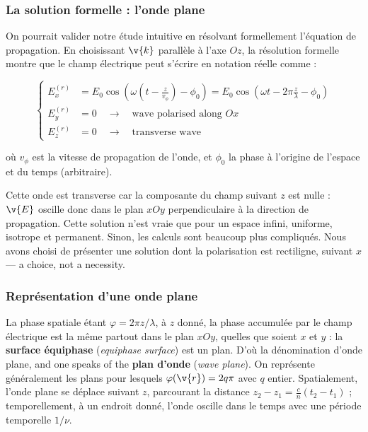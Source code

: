 \subsubsection{La solution formelle : l'onde plane}

On pourrait valider notre étude intuitive en résolvant formellement l'équation
de propagation. En choisissant $\v{k}$ parallèle à l'axe $Oz$, la résolution
formelle montre que le champ électrique peut s'écrire en notation réelle comme :

\[
  \left\{
  \begin{aligned}
    E^{(r)}_x&=E_0\cos\!\left(\omega\left(t-\frac{z}{v_\phi}\right)-\phi_0\right)
             =E_0\cos\!\left(\omega t-2\pi\frac{z}{\lambda}-\phi_0\right)\\
    E^{(r)}_y&=0 \quad\to\quad \text{wave polarised along } Ox\\
    E^{(r)}_z&=0 \quad\to\quad \text{transverse wave}
  \end{aligned}
  \right.
\]

où $v_\phi$ est la vitesse de propagation de l'onde, et $\phi_0$ la phase à
l'origine de l'espace et du temps (arbitraire).

\begin{remark}
  Cette onde est transverse car la composante du champ suivant $z$ est nulle :
  $\v{E}$ oscille donc dans le plan $xOy$ perpendiculaire à la direction de
  propagation. Cette solution n'est vraie que pour un espace infini, uniforme,
  isotrope et permanent. Sinon, les calculs sont beaucoup plus compliqués. Nous
  avons choisi de présenter une solution dont la polarisation est rectiligne,
  suivant $x$ --- a choice, not a necessity.
\end{remark}

\subsubsection{Représentation d'une onde plane}

La phase spatiale étant $\varphi=2\pi z/\lambda$, à $z$ donné, la phase
accumulée par le champ électrique est la même partout dans le plan $xOy$,
quelles que soient $x$ et $y$ : la \textbf{surface équiphase} (\textit{equiphase
surface}) est un plan. D'où la dénomination d'onde plane, and one speaks of the
\textbf{plan d'onde} (\textit{wave plane}). On représente généralement les plans
pour lesquels $\varphi(\v{r})=2q\pi$ avec $q$ entier. Spatialement, l'onde plane
se déplace suivant $z$, parcourant la distance $z_2-z_1=\frac{c}{n}(t_2-t_1)$ ;
temporellement, à un endroit donné, l'onde oscille dans le temps avec une
période temporelle $1/\nu$.

